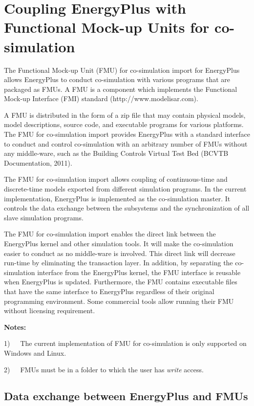\section{Coupling EnergyPlus with Functional Mock-up Units for co-simulation}\label{coupling-energyplus-with-functional-mock-up-units-for-co-simulation}

The Functional Mock-up Unit (FMU) for co-simulation import for EnergyPlus allows EnergyPlus to conduct co-simulation with various programs that are packaged as FMUs. A FMU is a component which implements the Functional Mock-up Interface (FMI) standard (http://www.modelisar.com).

A FMU is distributed in the form of a zip file that may contain physical models, model descriptions, source code, and executable programs for various platforms. The FMU for co-simulation import provides EnergyPlus with a standard interface to conduct and control co-simulation with an arbitrary number of FMUs without any middle-ware, such as the Building Controls Virtual Test Bed (BCVTB Documentation, 2011).

The FMU for co-simulation import allows coupling of continuous-time and discrete-time models exported from different simulation programs. In the current implementation, EnergyPlus is implemented as the co-simulation master. It controls the data exchange between the subsystems and the synchronization of all slave simulation programs.

The FMU for co-simulation import enables the direct link between the EnergyPlus kernel and other simulation tools. It will make the co-simulation easier to conduct as no middle-ware is involved. This direct link will decrease run-time by eliminating the transaction layer. In addition, by separating the co-simulation interface from the EnergyPlus kernel, the FMU interface is reusable when EnergyPlus is updated. Furthermore, the FMU contains executable files that have the same interface to EnergyPlus regardless of their original programming environment. Some commercial tools allow running their FMU without licensing requirement.

\textbf{Notes:}

1)~~~The current implementation of FMU for co-simulation is only supported on Windows and Linux.

2)~~~FMUs must be in a folder to which the user has \emph{write} access.

\subsection{Data exchange between EnergyPlus and FMUs}\label{data-exchange-between-energyplus-and-fmus}

